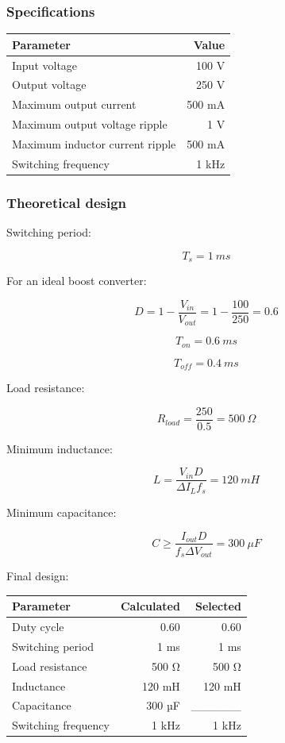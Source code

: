 \documentclass[
  paper=a4,
  oneside  ,captions=tableheading
]{scrartcl}
\newcounter{none}
\begin{document}
\subsubsection{Specifications}\label{specifications}

{\def\LTcaptype{none} %
\begin{longtable}[]{@{}lr@{}}
\toprule\noalign{}
Parameter & Value \\
\midrule\noalign{}
\endhead
\bottomrule\noalign{}
\endlastfoot
Input voltage & 100 V \\
Output voltage & 250 V \\
Maximum output current & 500 mA \\
Maximum output voltage ripple & 1 V \\
Maximum inductor current ripple & 500 mA \\
Switching frequency & 1 kHz \\
\end{longtable}
}

\subsubsection{Theoretical design}\label{theoretical-design-1}

Switching period:

\[
T_s=1\ ms
\]

For an ideal boost converter:

\[
D=1-\frac{V_{in}}{V_{out}}
=1-\frac{100}{250}
=0.6
\]

\[
T_{on}=0.6\ ms
\]

\[
T_{off}=0.4\ ms
\]

Load resistance:

\[
R_{load}=\frac{250}{0.5}=500\ \Omega
\]

Minimum inductance:

\[
L=
\frac{V_{in}D}
{\Delta I_Lf_s}
=
120\ mH
\]

Minimum capacitance:

\[
C\geq
\frac{I_{out}D}
{f_s\Delta V_{out}}
=
300\ \mu F
\]

Final design:

{\def\LTcaptype{none} %
\begin{longtable}[]{@{}lrr@{}}
\toprule\noalign{}
Parameter & Calculated & Selected \\
\midrule\noalign{}
\endhead
\bottomrule\noalign{}
\endlastfoot
Duty cycle & 0.60 & 0.60 \\
Switching period & 1 ms & 1 ms \\
Load resistance & 500 Ω & 500 Ω \\
Inductance & 120 mH & 120 mH \\
Capacitance & 300 µF & \_\_\_\_\_\_ \\
Switching frequency & 1 kHz & 1 kHz \\
\end{longtable}
}
\end{document}
